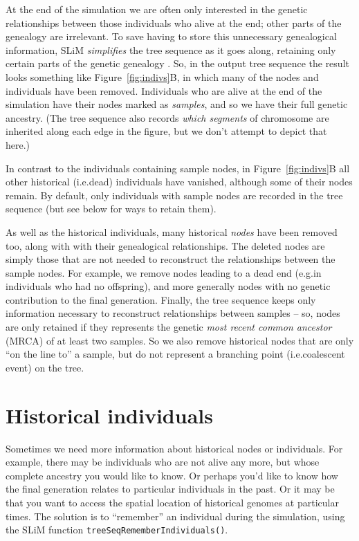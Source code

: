 \documentclass[12pt]{article}
\newcommand*{\eg}{e.g.\xcomma}
\newcommand*{\ie}{i.e.\xcomma}
\begin{document}
At the end of the simulation we are often only interested in the genetic
relationships between those individuals who alive at the end;
other parts of the genealogy are irrelevant.
To save having to store this unnecessary genealogical information,
SLiM \textit{simplifies} the tree sequence as it goes along, retaining
only certain parts of the genetic genealogy \citep{kelleher}.
So, in the output tree sequence the result looks something like Figure~\ref{fig:indivs}B,
in which many of the nodes and individuals have been removed.
Individuals who are alive at the end of the simulation
have their nodes marked as \textit{samples},
and so we have their full genetic ancestry.
(The tree sequence also records \emph{which segments} of chromosome are inherited
along each edge in the figure, but we don't attempt to depict that here.)

In contrast to the individuals containing sample nodes,
in Figure~\ref{fig:indivs}B
all other historical (\ie dead) individuals have vanished,
although some of their nodes remain.
By default, only individuals with sample nodes are recorded in the tree sequence
(but see below for ways to retain them).

As well as the historical individuals, many historical \textit{nodes} have been removed too,
along with with their genealogical relationships.
The deleted nodes are simply those that are
not needed to reconstruct the relationships between the sample nodes.
For example, we remove nodes leading to a dead end
(\eg in individuals who had no offspring),
and more generally nodes with no genetic contribution to the final generation.
Finally, the tree sequence keeps only information necessary
to reconstruct relationships between samples --
so, nodes are only retained if they
represents the genetic \textit{most recent common ancestor} (MRCA) of at least two samples.
So we also remove historical nodes that are only ``on the line to'' a sample,
but do not represent a branching point (\ie coalescent event) on the tree.

\section*{Historical individuals}

Sometimes we need more information about historical nodes or individuals.
For example, there may be individuals who are not alive any more,
but whose complete ancestry you would like to know.
Or perhaps you’d like to know how the final generation relates to particular individuals in the past.
Or it may be that you want to access the spatial location of historical genomes
at particular times.
The solution is to ``remember'' an individual during the simulation,
using the SLiM function \verb|treeSeqRememberIndividuals()|.
\end{document}
